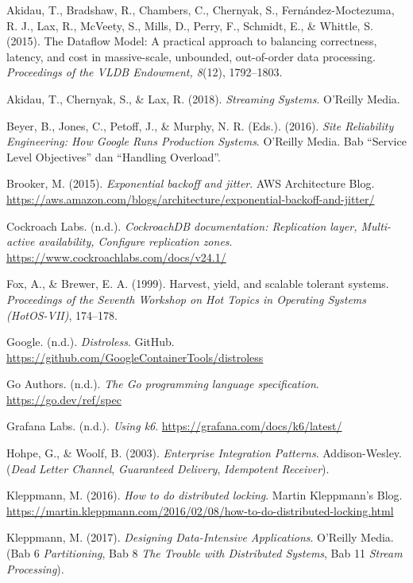 
\begin{list}{}{\leftmargin=1.2cm \itemindent=-1.2cm \itemsep=6pt}
\item Akidau, T., Bradshaw, R., Chambers, C., Chernyak, S., Fernández-Moctezuma, R. J., Lax, R., McVeety, S., Mills, D., Perry, F., Schmidt, E., \& Whittle, S. (2015). The Dataflow Model: A practical approach to balancing correctness, latency, and cost in massive-scale, unbounded, out-of-order data processing. \textit{Proceedings of the VLDB Endowment, 8}(12), 1792--1803.
\item Akidau, T., Chernyak, S., \& Lax, R. (2018). \textit{Streaming Systems}. O'Reilly Media.
\item Beyer, B., Jones, C., Petoff, J., \& Murphy, N. R. (Eds.). (2016). \textit{Site Reliability Engineering: How Google Runs Production Systems}. O'Reilly Media. Bab ``Service Level Objectives'' dan ``Handling Overload''.
\item Brooker, M. (2015). \textit{Exponential backoff and jitter}. AWS Architecture Blog. \url{https://aws.amazon.com/blogs/architecture/exponential-backoff-and-jitter/}
\item Cockroach Labs. (n.d.). \textit{CockroachDB documentation: Replication layer, Multi-active availability, Configure replication zones}. \url{https://www.cockroachlabs.com/docs/v24.1/}
\item Fox, A., \& Brewer, E. A. (1999). Harvest, yield, and scalable tolerant systems. \textit{Proceedings of the Seventh Workshop on Hot Topics in Operating Systems (HotOS-VII)}, 174--178.
\item Google. (n.d.). \textit{Distroless}. GitHub. \url{https://github.com/GoogleContainerTools/distroless}
\item Go Authors. (n.d.). \textit{The Go programming language specification}. \url{https://go.dev/ref/spec}
\item Grafana Labs. (n.d.). \textit{Using k6}. \url{https://grafana.com/docs/k6/latest/}
\item Hohpe, G., \& Woolf, B. (2003). \textit{Enterprise Integration Patterns}. Addison-Wesley. (\textit{Dead Letter Channel}, \textit{Guaranteed Delivery}, \textit{Idempotent Receiver}).
\item Kleppmann, M. (2016). \textit{How to do distributed locking}. Martin Kleppmann's Blog. \url{https://martin.kleppmann.com/2016/02/08/how-to-do-distributed-locking.html}
\item Kleppmann, M. (2017). \textit{Designing Data-Intensive Applications}. O'Reilly Media. (Bab 6 \textit{Partitioning}, Bab 8 \textit{The Trouble with Distributed Systems}, Bab 11 \textit{Stream Processing}).

\end{list}
